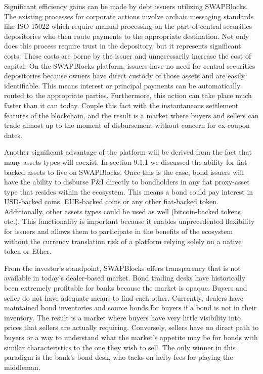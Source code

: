 \documentclass[12pt]{article}
\begin{document}
Significant efficiency gains can be made by debt issuers utilizing SWAPBlocks. The existing processes for 
corporate actions involve archaic messaging standards like ISO 15022 which require manual processing on the part of 
central securities depositories who then route payments to the appropriate destination. Not only does this process 
require trust in the depository, but it represents significant costs. These costs are borne by the issuer and 
unnecessarily increase the cost of capital. On the SWAPBlocks platform, issuers have no need for central securities depositories 
because owners have direct custody of those assets and are easily identifiable. This means interest or principal payments can be 
automatically routed to the appropriate parties. Furthermore, this action can take place much faster than it can today. Couple 
this fact with the instantaneous settlement features of the blockchain, and the result is a market where buyers 
and sellers can trade almost up to the moment of disbursement without concern for ex-coupon dates.

Another significant advantage of the platform will be derived from the fact that many assets types will coexist. In 
section 9.1.1 we discussed the ability for fiat-backed assets to live on SWAPBlocks. Once this is the case, bond 
issuers will have the ability to disburse P\&I directly to bondholders in any fiat proxy-asset type that resides within the ecosystem. 
This means a bond could pay interest in USD-backed coins, EUR-backed coins or any other fiat-backed token. 
Additionally, other assets types could be used as well (bitcoin-backed tokens, etc.). This functionality is important 
because it enables unprecedented flexibility for issuers and allows them to participate in the benefits of the 
ecosystem without the currency translation risk of a platform relying solely on a native token or Ether.

From the investor’s standpoint, SWAPBlocks offers transparency that is not available in today’s dealer-based market. 
Bond trading desks have historically been extremely profitable for banks because the market is opaque. Buyers and 
seller do not have adequate means to find each other. Currently, dealers have maintained bond inventories and 
source bonds for buyers if a bond is not in their inventory. The result is a market where buyers have very little visibility 
into prices that sellers are actually requiring. Conversely, sellers have no direct path to buyers or a way to understand 
what the market’s appetite may be for bonds with similar characteristics to the one they wish to sell. The only 
winner in this paradigm is the bank’s bond desk, who tacks on hefty fees for playing the middleman. 
\end{document}
